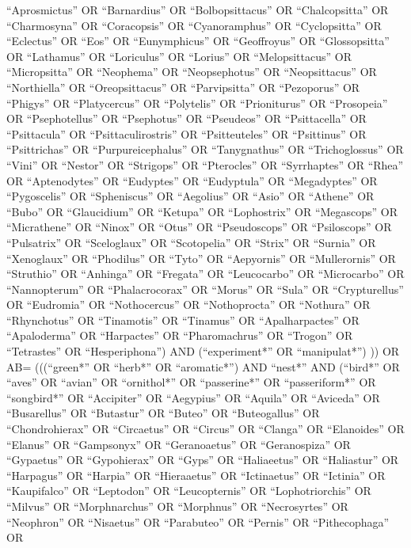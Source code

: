 \documentclass[
  number,
  review,
  onecolumn]{elsarticle}
\begin{document}
``Aprosmictus'' OR ``Barnardius'' OR ``Bolbopsittacus'' OR
``Chalcopsitta'' OR ``Charmosyna'' OR ``Coracopsis'' OR ``Cyanoramphus''
OR ``Cyclopsitta'' OR ``Eclectus'' OR ``Eos'' OR ``Eunymphicus'' OR
``Geoffroyus'' OR ``Glossopsitta'' OR ``Lathamus'' OR ``Loriculus'' OR
``Lorius'' OR ``Melopsittacus'' OR ``Micropsitta'' OR ``Neophema'' OR
``Neopsephotus'' OR ``Neopsittacus'' OR ``Northiella'' OR
``Oreopsittacus'' OR ``Parvipsitta'' OR ``Pezoporus'' OR ``Phigys'' OR
``Platycercus'' OR ``Polytelis'' OR ``Prioniturus'' OR ``Prosopeia'' OR
``Psephotellus'' OR ``Psephotus'' OR ``Pseudeos'' OR ``Psittacella'' OR
``Psittacula'' OR ``Psittaculirostris'' OR ``Psitteuteles'' OR
``Psittinus'' OR ``Psittrichas'' OR ``Purpureicephalus'' OR
``Tanygnathus'' OR ``Trichoglossus'' OR ``Vini'' OR ``Nestor'' OR
``Strigops'' OR ``Pterocles'' OR ``Syrrhaptes'' OR ``Rhea'' OR
``Aptenodytes'' OR ``Eudyptes'' OR ``Eudyptula'' OR ``Megadyptes'' OR
``Pygoscelis'' OR ``Spheniscus'' OR ``Aegolius'' OR ``Asio'' OR
``Athene'' OR ``Bubo'' OR ``Glaucidium'' OR ``Ketupa'' OR ``Lophostrix''
OR ``Megascops'' OR ``Micrathene'' OR ``Ninox'' OR ``Otus'' OR
``Pseudoscops'' OR ``Psiloscops'' OR ``Pulsatrix'' OR ``Sceloglaux'' OR
``Scotopelia'' OR ``Strix'' OR ``Surnia'' OR ``Xenoglaux'' OR
``Phodilus'' OR ``Tyto'' OR ``Aepyornis'' OR ``Mullerornis'' OR
``Struthio'' OR ``Anhinga'' OR ``Fregata'' OR ``Leucocarbo'' OR
``Microcarbo'' OR ``Nannopterum'' OR ``Phalacrocorax'' OR ``Morus'' OR
``Sula'' OR ``Crypturellus'' OR ``Eudromia'' OR ``Nothocercus'' OR
``Nothoprocta'' OR ``Nothura'' OR ``Rhynchotus'' OR ``Tinamotis'' OR
``Tinamus'' OR ``Apalharpactes'' OR ``Apaloderma'' OR ``Harpactes'' OR
``Pharomachrus'' OR ``Trogon'' OR ``Tetrastes'' OR ``Hesperiphona'') AND
(``experiment*'' OR ``manipulat*'') )) OR AB= (((``green*'' OR ``herb*''
OR ``aromatic*'') AND ``nest*'' AND (``bird*'' OR ``aves'' OR ``avian''
OR ``ornithol*'' OR ``passerine*'' OR ``passeriform*'' OR ``songbird*''
OR ``Accipiter'' OR ``Aegypius'' OR ``Aquila'' OR ``Aviceda'' OR
``Busarellus'' OR ``Butastur'' OR ``Buteo'' OR ``Buteogallus'' OR
``Chondrohierax'' OR ``Circaetus'' OR ``Circus'' OR ``Clanga'' OR
``Elanoides'' OR ``Elanus'' OR ``Gampsonyx'' OR ``Geranoaetus'' OR
``Geranospiza'' OR ``Gypaetus'' OR ``Gypohierax'' OR ``Gyps'' OR
``Haliaeetus'' OR ``Haliastur'' OR ``Harpagus'' OR ``Harpia'' OR
``Hieraaetus'' OR ``Ictinaetus'' OR ``Ictinia'' OR ``Kaupifalco'' OR
``Leptodon'' OR ``Leucopternis'' OR ``Lophotriorchis'' OR ``Milvus'' OR
``Morphnarchus'' OR ``Morphnus'' OR ``Necrosyrtes'' OR ``Neophron'' OR
``Nisaetus'' OR ``Parabuteo'' OR ``Pernis'' OR ``Pithecophaga'' OR
\end{document}
